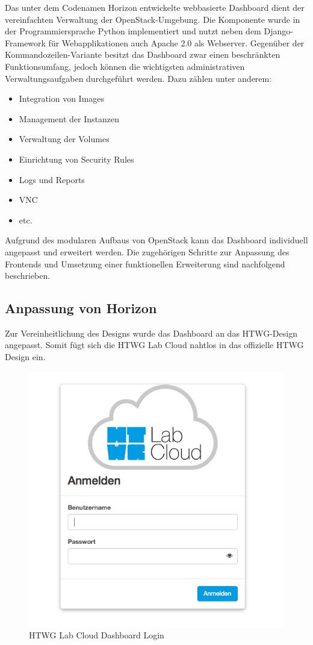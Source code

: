 Das unter dem Codenamen Horizon entwickelte webbasierte Dashboard dient der vereinfachten Verwaltung der OpenStack-Umgebung. Die Komponente wurde in der Programmiersprache Python implementiert und nutzt neben dem Django-Framework für Webapplikationen auch Apache 2.0 als Webserver. Gegenüber der Kommandozeilen-Variante besitzt das Dashboard zwar einen beschränkten Funktionsumfang, jedoch können die wichtigsten administrativen Verwaltungsaufgaben durchgeführt werden. Dazu zählen unter anderem:
\begin{itemize}
\item Integration von Images
\item Management der Instanzen
\item Verwaltung der Volumes
\item Einrichtung von Security Rules
\item Logs und Reports
\item VNC
\item etc.
\end{itemize}
Aufgrund des modularen Aufbaus von OpenStack kann das Dashboard individuell angepasst und erweitert werden. Die zugehörigen Schritte zur Anpassung des Frontends und Umsetzung einer funktionellen Erweiterung sind nachfolgend beschrieben.

\subsection{Anpassung von Horizon}

Zur Vereinheitlichung des Designs wurde das Dashboard an das HTWG-Design angepasst. Somit fügt sich die HTWG Lab Cloud nahtlos in das offizielle HTWG Design ein.

\begin{figure}[htbp]
\centering
\includegraphics[scale=0.4]{img/dashboard-login.png}
\caption{HTWG Lab Cloud Dashboard Login}
\label{dashboard-login}
\end{figure}

